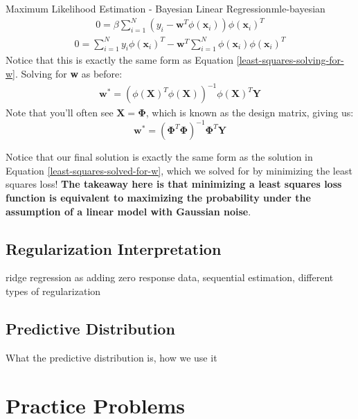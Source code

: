 \begin{derivation}{Maximum Likelihood Estimation - Bayesian Linear Regression}{mle-bayesian}
    \begin{align*}
        0 = \beta \sum_{i=1}^{N} (y_{i} - \textbf{w}^{T}\phi(\textbf{x}_{i}))\phi(\textbf{x}_{i})^{T}
    \end{align*}
    \begin{align*}
        0 = \sum_{i=1}^{N} y_{i}\phi(\textbf{x}_{i})^{T} - \textbf{w}^{T} \sum_{i=1}^{N} \phi(\textbf{x}_{i})\phi(\textbf{x}_{i})^{T}
    \end{align*}
    Notice that this is exactly the same form as Equation \ref{least-squares-solving-for-w}. Solving for \textbf{w} as before:
    \begin{align*}
        \textbf{w}^{*} = (\phi(\textbf{X})^{T}\phi(\textbf{X}))^{-1}\phi(\textbf{X})^{T}\textbf{Y}
    \end{align*}
    Note that you'll often see $\textbf{X} = \boldsymbol{\Phi}$, which is known as the design matrix, giving us:
    \begin{equation} \label{bayesian-solved-for-w}
        \textbf{w}^{*} = (\boldsymbol{\Phi}^{T}\boldsymbol{\Phi})^{-1}\boldsymbol{\Phi}^{T}\textbf{Y}
    \end{equation}
\end{derivation}

Notice that our final solution is exactly the same form as the solution in Equation \ref{least-squares-solved-for-w}, which we solved for by minimizing the least squares loss! \textbf{The takeaway here is that minimizing a least squares loss function is equivalent to maximizing the probability under the assumption of a linear model with Gaussian noise}.

\subsection{Regularization Interpretation}
ridge regression as adding zero response data, sequential estimation, different types of regularization

\subsection{Predictive Distribution}
What the predictive distribution is, how we use it

\section{Practice Problems}